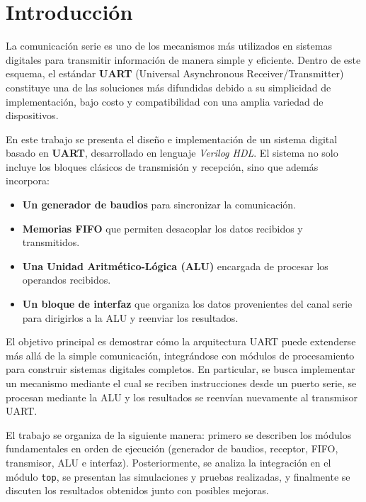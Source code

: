 \section{Introducción}

La comunicación serie es uno de los mecanismos más utilizados en sistemas digitales para transmitir información de manera simple y eficiente. Dentro de este esquema, el estándar \textbf{UART} (Universal Asynchronous Receiver/Transmitter) constituye una de las soluciones más difundidas debido a su simplicidad de implementación, bajo costo y compatibilidad con una amplia variedad de dispositivos.

En este trabajo se presenta el diseño e implementación de un sistema digital basado en \textbf{UART}, desarrollado en lenguaje \textit{Verilog HDL}. El sistema no solo incluye los bloques clásicos de transmisión y recepción, sino que además incorpora:

\begin{itemize}
    \item \textbf{Un generador de baudios} para sincronizar la comunicación.
    \item \textbf{Memorias FIFO} que permiten desacoplar los datos recibidos y transmitidos.
    \item \textbf{Una Unidad Aritmético-Lógica (ALU)} encargada de procesar los operandos recibidos.
    \item \textbf{Un bloque de interfaz} que organiza los datos provenientes del canal serie para dirigirlos a la ALU y reenviar los resultados.
\end{itemize}

El objetivo principal es demostrar cómo la arquitectura UART puede extenderse más allá de la simple comunicación, integrándose con módulos de procesamiento para construir sistemas digitales completos. En particular, se busca implementar un mecanismo mediante el cual se reciben instrucciones desde un puerto serie, se procesan mediante la ALU y los resultados se reenvían nuevamente al transmisor UART.

El trabajo se organiza de la siguiente manera: primero se describen los módulos fundamentales en orden de ejecución (generador de baudios, receptor, FIFO, transmisor, ALU e interfaz). Posteriormente, se analiza la integración en el módulo \texttt{top}, se presentan las simulaciones y pruebas realizadas, y finalmente se discuten los resultados obtenidos junto con posibles mejoras.
